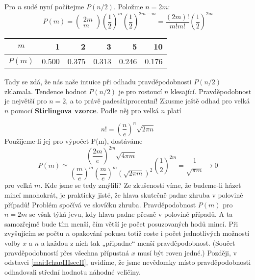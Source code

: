 \begin{example}
  Pro \(n\) sudé nyní počítejme \(P(n/2)\). Položme \(n = 2m\):
  \begin{equation*}
    P(m) = \begin{pmatrix} 2m \\ m\end{pmatrix} 
           \left(\dfrac{1}{2}\right)^m\left(\dfrac{1}{2}\right)^{2m-m} 
         = \dfrac{(2m)!}{m!m!}\left(\dfrac{1}{2}\right)^{2m}     
  \end{equation*}

  \begin{table}[ht!]
    \centering
    \begin{tabular}{c|rrrrr}
      \(m\)    & 1 & 2 & 3 & 5 & 10  \\ \hline
      \(P(m)\) & \num{0.500} & \num{0.375} & \num{0.313} & \num{0.246} & \num{0.176}
    \end{tabular}
  \end{table}
  
  Tady se zdá, že nás naše intuice při odhadu pravděpodobnosti \(P(n/2)\) zklamala. Tendence hodnot 
  \(P(n/2)\) je pro rostoucí \(n\) klesající. Pravděpodobnost je největší pro \(n = 2\), a to právě 
  padesátiprocentní! Zkusme ještě odhad pro velká \(n\) pomocí \textbf{Stirlingova vzorce}. Podle 
  něj pro velká \(n\) platí
  
  \begin{equation}\label{mai:eq056}
    n! = \left(\dfrac{n}{e}\right)^n\sqrt{2\pi n}
  \end{equation}
  Použijeme-li jej pro výpočet P(m), dostáváme
  \begin{equation*}
    P(m)\simeq \dfrac{\left(\dfrac{2m}{e}\right)^{2m}\sqrt{4\pi m}}
     {\left(\dfrac{m}{e}\right)^m\left(\dfrac{m}{e}\right)^m\left(\sqrt{2\pi m}\right)^2}
     \left(\dfrac{1}{2}\right)^{2m} = \dfrac{1}{\sqrt{\pi m}} \longrightarrow 0
  \end{equation*}
  pro velká \(m\). Kde jsme se tedy zmýlili? Ze zkušenosti víme, že budeme-li házet mincí 
  mnohokrát, je prakticky jisté, že hlava skutečně padne zhruba v polovině případů! Problém spočívá 
  ve slovíčku zhruba. Pravděpodobnost \(P(m)\) pro \(n = 2m\) se však týká jevu, kdy hlava padne 
  přesně v polovině případů. A ta samozřejmě bude tím menší, čím větší je počet posuzovaných hodů 
  mincí. Při zvyšujícím se počtu \(n\) opakování pokusu totiž roste i počet jednotlivých možností 
  volby \(x\) a \(n\) a každou z nich tak „připadne“ menší pravděpodobnost. (Součet  
  pravděpodobností přes všechna přípustná \(x\) musí být roven jedné.) Později, v odstavci 
  \ref{mai:IchapIIIsecII}, uvidíme, že jsme nevědomky místo pravděpodobnosti odhadovali střední 
  hodnotu náhodné veličiny.
  

\end{example}
